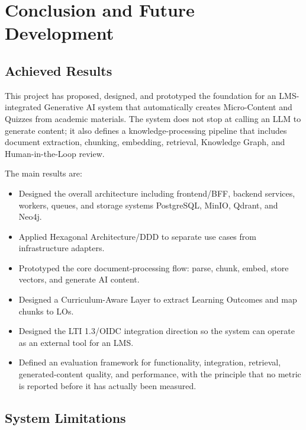 \chapter{Conclusion and Future Development}
\label{chap:ket-luan-huong-phat-trien}

\section{Achieved Results}

This project has proposed, designed, and prototyped the foundation for an
LMS-integrated Generative AI system that automatically creates
Micro-Content and Quizzes from academic materials. The system does not
stop at calling an LLM to generate content; it also defines a
knowledge-processing pipeline that includes document extraction,
chunking, embedding, retrieval, Knowledge Graph, and Human-in-the-Loop
review.

The main results are:
\begin{itemize}
    \item Designed the overall architecture including frontend/BFF,
          backend services, workers, queues, and storage systems PostgreSQL,
          MinIO, Qdrant, and Neo4j.
    \item Applied Hexagonal Architecture/DDD to separate use cases from
          infrastructure adapters.
    \item Prototyped the core document-processing flow: parse, chunk,
          embed, store vectors, and generate AI content.
    \item Designed a Curriculum-Aware Layer to extract Learning Outcomes
          and map chunks to LOs.
    \item Designed the LTI 1.3/OIDC integration direction so the system can
          operate as an external tool for an LMS.
    \item Defined an evaluation framework for functionality, integration,
          retrieval, generated-content quality, and performance, with the
          principle that no metric is reported before it has actually
          been measured.
\end{itemize}

\section{System Limitations}

